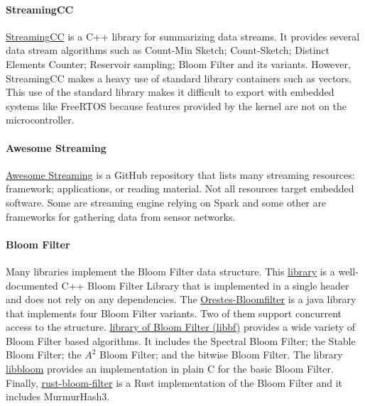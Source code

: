 \documentclass{article}
\begin{document}
\paragraph{StreamingCC}
	\href{https://github.com/jiecchen/StreamingCC}{StreamingCC} is a C++ library for summarizing data streams.
	It provides several data stream algorithms such as Count-Min Sketch;
	Count-Sketch; Distinct Elements Counter; Reservoir sampling; Bloom Filter and its variants.
	However, StreamingCC makes a heavy use of standard library containers such as vectors.
	This use of the standard library makes it difficult to export with embedded systems like
	FreeRTOS because features provided by the kernel  are not on the microcontroller.

\paragraph{Awesome Streaming}
	\href{https://github.com/manuzhang/awesome-streaming}{Awesome Streaming} is a GitHub repository that lists many streaming resources:
	framework; applications, or reading material.
	Not all resources target embedded software. Some are streaming engine relying on Spark and some other are frameworks for gathering
	data from sensor networks.

\paragraph{Bloom Filter}
	Many libraries implement the Bloom Filter data structure.
	This \href{http://www.partow.net/programming/bloomfilter/index.html}{library} is a
	well-documented C++ Bloom Filter Library that is implemented in a single header
	and does not rely on any dependencies.
	The \href{https://github.com/Baqend/Orestes-Bloomfilter}{Orestes-Bloomfilter}
	is a java library that implements four Bloom Filter variants.
	Two of them support concurrent access to the structure.
	\href{http://matthias.vallentin.net/blog/2011/06/a-garden-variety-of-bloom-filters/}{library of Bloom Filter (libbf)}
	provides a wide variety of Bloom Filter based algorithms. It includes the Spectral Bloom Filter; the Stable Bloom Filter; the $A^2$ Bloom Filter; and
	the bitwise Bloom Filter.
	The library \href{https://github.com/jvirkki/libbloom}{libbloom} provides an implementation in plain C for the basic Bloom Filter.
	Finally, \href{https://github.com/brianmadden/rust-bloom-filter}{rust-bloom-filter} is a Rust implementation of the Bloom Filter
	and it includes MurmurHash3.
\end{document}
